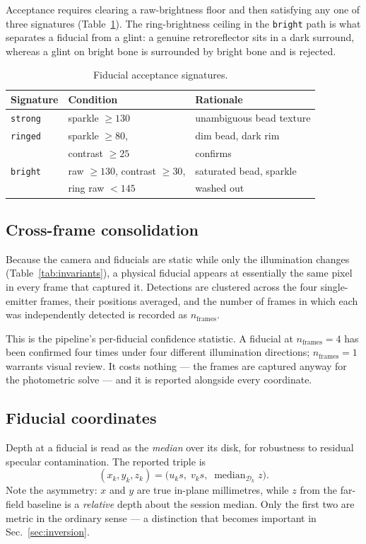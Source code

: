\documentclass[journal,10pt]{IEEEtran}
\begin{document}
Acceptance requires clearing a raw-brightness floor and then satisfying any one
of three signatures (Table~\ref{tab:signatures}). The ring-brightness ceiling in
the \texttt{bright} path is what separates a fiducial from a glint: a genuine
retroreflector sits in a dark surround, whereas a glint on bright bone is
surrounded by bright bone and is rejected.

\begin{table}[t]
\centering
\caption{Fiducial acceptance signatures.}
\label{tab:signatures}
\footnotesize
\begin{tabular}{@{}l l p{}@{}}
\toprule
\textbf{Signature} & \textbf{Condition} & \textbf{Rationale} \\
\midrule
\texttt{strong} & sparkle $\ge 130$ & unambiguous bead texture \\
\texttt{ringed} & sparkle $\ge 80$, & dim bead, dark rim \\
                & contrast $\ge 25$ & confirms \\
\texttt{bright} & raw $\ge 130$, contrast $\ge 30$, & saturated bead, sparkle \\
                & ring raw $< 145$ & washed out \\
\bottomrule
\end{tabular}
\end{table}

\subsection{Cross-frame consolidation}\label{sec:consolidation}
Because the camera and fiducials are static while only the illumination changes
(Table~\ref{tab:invariants}), a physical fiducial appears at essentially the same
pixel in every frame that captured it. Detections are clustered across the four
single-emitter frames, their positions averaged, and the number of frames in
which each was independently detected is recorded as $n_\mathrm{frames}$.

This is the pipeline's per-fiducial confidence statistic. A fiducial at
$n_\mathrm{frames}=4$ has been confirmed four times under four different
illumination directions; $n_\mathrm{frames}=1$ warrants visual review. It costs
nothing --- the frames are captured anyway for the photometric solve --- and it
is reported alongside every coordinate.

\subsection{Fiducial coordinates}
Depth at a fiducial is read as the \emph{median} over its disk, for robustness to
residual specular contamination. The reported triple is
\begin{equation}
(x_k, y_k, z_k) = \bigl(u_k s,\; v_k s,\;
\operatorname{median}_{\mathcal{D}_k} z \bigr) .
\end{equation}
Note the asymmetry: $x$ and $y$ are true in-plane millimetres, while $z$ from the
far-field baseline is a \emph{relative} depth about the session median. Only the
first two are metric in the ordinary sense --- a distinction that becomes
important in Sec.~\ref{sec:inversion}.
\end{document}
